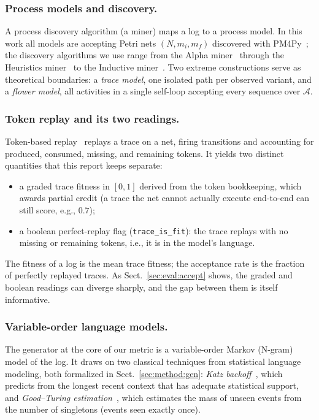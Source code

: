 \documentclass[runningheads]{llncs}
\begin{document}
\subsubsection{Process models and discovery.}
A process discovery algorithm (a miner) maps a log to a process model. In this work all models are accepting Petri nets $(N,m_i,m_f)$ discovered with PM4Py~\cite{berti2019pm4py}; the discovery algorithms we use range from the Alpha miner~\cite{vanderaalst2004alpha} through the Heuristics miner~\cite{weijters2006hm} to the Inductive miner~\cite{leemans2013im,leemans2014imf}. Two extreme constructions serve as theoretical boundaries: a \emph{trace model}, one isolated path per observed variant, and a \emph{flower model}, all activities in a single self-loop accepting every sequence over $\mathcal{A}$.

\subsubsection{Token replay and its two readings.}
Token-based replay~\cite{rozinat2008conformance} replays a trace on a net, firing transitions and accounting for produced, consumed, missing, and remaining tokens. It yields two distinct quantities that this report keeps separate:
\begin{itemize}
  \item a graded trace fitness in $[0,1]$ derived from the token bookkeeping, which awards partial credit (a trace the net cannot actually execute end-to-end can still score, e.g., $0.7$);
  \item a boolean perfect-replay flag (\texttt{trace\_is\_fit}): the trace replays with no missing or remaining tokens, i.e., it is in the model's language.
\end{itemize}
The fitness of a log is the mean trace fitness; the acceptance rate is the fraction of perfectly replayed traces. As Sect.~\ref{sec:eval:accept} shows, the graded and boolean readings can diverge sharply, and the gap between them is itself informative.

\subsubsection{Variable-order language models.}
The generator at the core of our metric is a variable-order Markov (N-gram) model of the log. It draws on two classical techniques from statistical language modeling, both formalized in Sect.~\ref{sec:method:gen}: \emph{Katz backoff}~\cite{katz1987}, which predicts from the longest recent context that has adequate statistical support, and \emph{Good--Turing estimation}~\cite{gale1995gt}, which estimates the mass of unseen events from the number of singletons (events seen exactly once).
\end{document}
